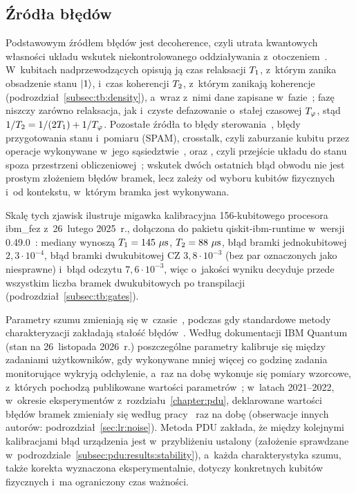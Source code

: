 \subsection{Źródła błędów}\label{subsec:tb:noise:sources}

Podstawowym źródłem błędów jest \gls{decoherence}, czyli utrata kwantowych własności układu wskutek niekontrolowanego oddziaływania z~otoczeniem~\cite{zurek_decoherence_2003,bib:quantum-decoherence}.
W~kubitach nadprzewodzących opisują ją czas relaksacji $T_1$, z~którym zanika obsadzenie stanu $\ket{1}$, i~czas koherencji $T_2$, z~którym zanikają koherencje (podrozdział~\ref{subsec:tb:density}), a~wraz z~nimi dane zapisane w~fazie~\cite{krantz_quantum_2019}; fazę niszczy zarówno relaksacja, jak i~czyste defazowanie o~stałej czasowej $T_{\varphi}$, stąd $1/T_2=1/(2T_1)+1/T_{\varphi}$.
Pozostałe źródła to błędy sterowania~\cite{krantz_quantum_2019}, błędy przygotowania stanu i~pomiaru (SPAM), \gls{crosstalk}, czyli zaburzanie kubitu przez operacje wykonywane w~jego sąsiedztwie~\cite{sarovar_detecting_2020,mundada2019crosstalk}, oraz , czyli przejście układu do stanu spoza przestrzeni obliczeniowej~\cite{Wood2015}; wskutek dwóch ostatnich błąd obwodu nie jest prostym złożeniem błędów bramek, lecz zależy od wyboru kubitów fizycznych i~od kontekstu, w~którym bramka jest wykonywana.

Skalę tych zjawisk ilustruje migawka kalibracyjna 156-kubitowego procesora ibm\_fez z~26~lutego 2025~r., dołączona do pakietu qiskit-ibm-runtime w~wersji 0.49.0~\cite{qiskit_ibm_runtime_2026}: mediany wynoszą $T_1=145~\mu\mathrm{s}$, $T_2=88~\mu\mathrm{s}$, błąd bramki jednokubitowej $2{,}3\cdot10^{-4}$, błąd bramki dwukubitowej CZ $3{,}8\cdot10^{-3}$ (bez par oznaczonych jako niesprawne) i~błąd odczytu $7{,}6\cdot10^{-3}$, więc o~jakości wyniku decyduje przede wszystkim liczba bramek dwukubitowych po transpilacji (podrozdział~\ref{subsec:tb:gates}).

Parametry szumu zmieniają się w~czasie~\cite{burnett_decoherence_2019}, podczas gdy standardowe metody charakteryzacji zakładają stałość błędów~\cite{proctor_detecting_2020}.
Według dokumentacji IBM Quantum (stan na 26~listopada 2026~r.) poszczególne parametry kalibruje się między zadaniami użytkowników, gdy wykonywane mniej więcej co godzinę zadania monitorujące wykryją odchylenie, a~raz na dobę wykonuje się pomiary wzorcowe, z~których pochodzą publikowane wartości parametrów~\cite{ibm_calibration_docs_2026}; w~latach 2021--2022, w~okresie eksperymentów z~rozdziału~\ref{chapter:pdu}, deklarowane wartości błędów bramek zmieniały się według pracy~\cite{werner_experiment_driven_2022} raz na dobę (obserwacje innych autorów: podrozdział~\ref{sec:lr:noise}).
Metoda PDU zakłada, że między kolejnymi kalibracjami błąd urządzenia jest w~przybliżeniu ustalony (założenie sprawdzane w~podrozdziale~\ref{subsec:pdu:results:stability}), a~każda charakterystyka szumu, także korekta wyznaczona eksperymentalnie, dotyczy konkretnych kubitów fizycznych i~ma ograniczony czas ważności.

